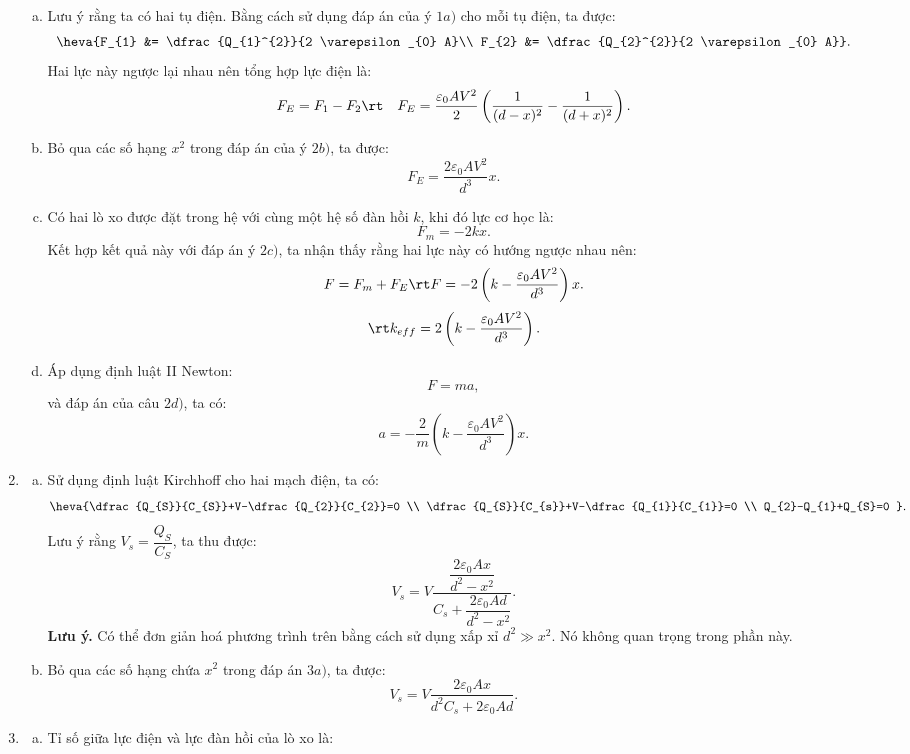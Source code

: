 \begin{loigiai}
\begin{enumerate}[1)]
\begin{enumerate}[a)]
        \item Lưu ý rằng ta có hai tụ điện. Bằng cách sử dụng đáp án của ý $1a)$ cho mỗi tụ điện, ta được:
        \[\heva{F_{1} &= \dfrac{Q_{1}^{2}}{2 \varepsilon_{0} A}\\ F_{2} &= \dfrac{Q_{2}^{2}}{2 \varepsilon_{0} A}}.\]
        Hai lực này ngược lại nhau nên tổng hợp lực điện là:
        \[F_{E}=F_{1}-F_{2} \rt \quad F_{E}=\dfrac{\varepsilon_{0} A V^{2}}{2}\left(\dfrac{1}{(d-x)^{2}}-\dfrac{1}{(d+x)^{2}}\right). \]
        \item Bỏ qua các số hạng $x^2$ trong đáp án của ý $2b)$, ta được:
        \[F_{E}=\dfrac{2 \varepsilon_{0} A V^{2}}{d^{3}} x.\]
        \item Có hai lò xo được đặt trong hệ với cùng một hệ số đàn hồi $k$, khi đó lực cơ học là:
        \[F_{m}=-2 k x.\]
        Kết hợp kết quả này với đáp án ý $2c)$, ta nhận thấy rằng hai lực này có hướng ngược nhau nên:
        \[F = F_{m} + F_{E} \rt F = -2\left(k-\dfrac{\varepsilon_{0} A V^{2}}{d^{3}}\right) x.\]
        \[\rt k_{e f f} = 2\left(k-\dfrac{\varepsilon_{0} A V^{2}}{d^{3}}\right).\]
        \item Áp dụng định luật II Newton:
        \[F=m a,\]
        và đáp án của câu $2d)$, ta có:
        \[a=-\dfrac{2}{m}\left(k-\dfrac{\varepsilon_{0} A V^{2}}{d^{3}}\right) x.\]
    \end{enumerate}
    \item 
    \begin{enumerate}[a)]
        \item Sử dụng định luật Kirchhoff cho hai mạch điện, ta có:
        \[\heva{\dfrac{Q_{S}}{C_{S}}+V-\dfrac{Q_{2}}{C_{2}}=0 \\ \dfrac{Q_{S}}{C_{s}}+V-\dfrac{Q_{1}}{C_{1}}=0 \\ Q_{2}-Q_{1}+Q_{S}=0 }.\]
        Lưu ý rằng $V_{s}=\dfrac{Q_{S}}{C_{S}}$, ta thu được:
        \[V_{s} = V \dfrac{\dfrac{2 \varepsilon_{0} A x}{d^{2}-x^{2}}}{C_{s} + \dfrac{2 \varepsilon_{0} A d}{d^{2}-x^{2}}}.\]
        \textbf{Lưu ý.} Có thể đơn giản hoá phương trình trên bằng cách sử dụng xấp xỉ $d^{2} \gg x^{2}$. Nó không quan trọng trong phần này.
        \item Bỏ qua các số hạng chứa $x^2$ trong đáp án $3a)$, ta được:
        \[V_{s} = V \dfrac{2 \varepsilon_{0} A x}{d^{2} C_{s}+2 \varepsilon_{0} A d}.\]
    \end{enumerate}
    \item 
    \begin{enumerate}[a)]
        \item Tỉ số giữa lực điện và lực đàn hồi của lò xo là:

\end{enumerate}
\end{enumerate}
\end{loigiai}
